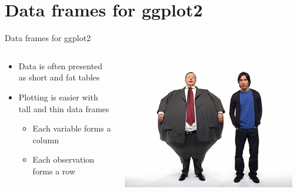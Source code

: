 \documentclass[aspectratio=169]{beamer}\usepackage[]{graphicx}\usepackage[]{color}
\begin{document}
\section{Data frames for ggplot2}
\begin{frame}[fragile]{Data frames for ggplot2}
\begin{columns}
  \begin{column}{0.50\textwidth}
    \begin{itemize}
      \item Data is often presented as short and fat tables
      \item Plotting is easier with tall and thin data frames
      \begin{itemize}
        \item Each variable forms a column
        \item Each observation forms a row
      \end{itemize}
    \end{itemize}
  \end{column}
	\begin{column}{0.5\textwidth}
  \begin{center}
      \includegraphics[width=0.95\textwidth]{./fat_vs_thin.png}
  \end{center}
  \end{column}
\end{columns}
\end{frame}
\end{document}
